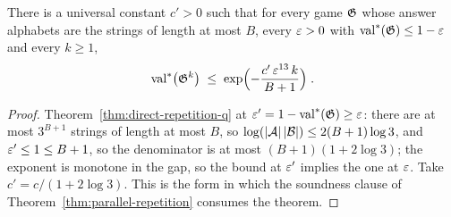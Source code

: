 \begin{lemma}
\label{lem:repetition-sound-bound}
\leanok
There is a universal constant $c' > 0$ such that for every game $\mathfrak{G}$ whose answer
alphabets are the strings of length at most $B$, every $\varepsilon > 0$ with $\mathrm{val}^*(\mathfrak{G}) \leq
1 - \varepsilon$ and every $k \geq 1$,
\begin{equation*}
  \mathrm{val}^*\bigl( \mathfrak{G}^{k} \bigr) \;\leq\; \exp\Bigl( - \frac{c'\, \varepsilon^{13}\, k}{B + 1} \Bigr)\;.
\end{equation*}
\end{lemma}
\begin{proof}
\leanok
Theorem~\ref{thm:direct-repetition-q} at $\varepsilon' = 1 - \mathrm{val}^*(\mathfrak{G}) \geq \varepsilon$: there are at
most $3^{B+1}$ strings of length at most $B$, so $\log(\left\vert {\ensuremath{\mathcal{A}}} \right\vert\left\vert {\ensuremath{\mathcal{B}}} \right\vert) \leq 2(B + 1)
\log 3$, and $\varepsilon' \leq 1 \leq B + 1$, so the denominator is at most $(B + 1)(1 + 2 \log 3)$;
the exponent is monotone in the gap, so the bound at $\varepsilon'$ implies the one at $\varepsilon$. Take
$c' = c / (1 + 2 \log 3)$. This is the form in which the soundness clause of
Theorem~\ref{thm:parallel-repetition} consumes the theorem.
\end{proof}

